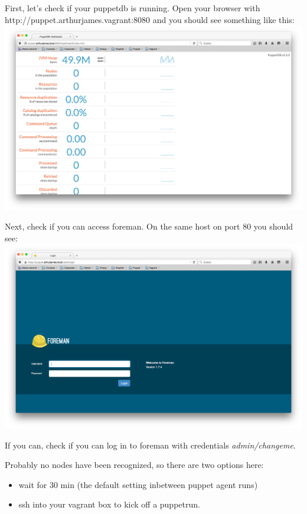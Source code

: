 \documentclass{article}
\begin{document}
\par First, let's check if your puppetdb is running. Open your browser with http://puppet.arthurjames.vagrant:8080 and you should see something like this:\\
\includegraphics[scale=0.3]{images/puppetdb}


\par Next, check if you can access foreman. On the same host on port 80 you should see:\\
\includegraphics[scale=0.3]{images/foreman}

\par If you can, check if you can log in to foreman with credentials \emph{admin/changeme}.
\par Probably no nodes have been recognized, so there are two options here:
\begin{itemize}
\item wait for 30 min (the default setting inbetween puppet agent runs)
\item ssh into your vagrant box to kick off a puppetrun.
\end{itemize} 
\end{document}
